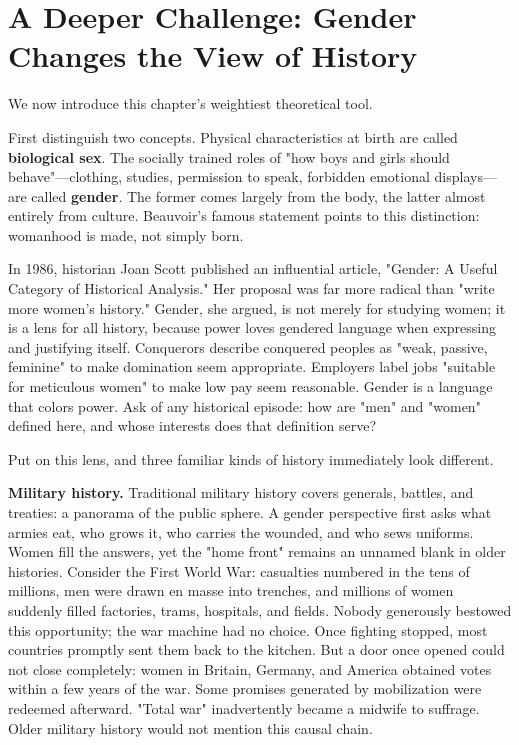\section[Gender Changes the View of History]{A Deeper Challenge: Gender Changes the View of History}
We now introduce this chapter's weightiest theoretical tool.

First distinguish two concepts. Physical characteristics at birth are called \textbf{biological sex}. The socially trained roles of "how boys and girls should behave"---clothing, studies, permission to speak, forbidden emotional displays---are called \textbf{gender}. The former comes largely from the body, the latter almost entirely from culture. Beauvoir's famous statement points to this distinction: womanhood is made, not simply born.

In 1986, historian Joan Scott published an influential article, "Gender: A Useful Category of Historical Analysis." Her proposal was far more radical than "write more women's history." Gender, she argued, is not merely for studying women; it is a lens for all history, because power loves gendered language when expressing and justifying itself. Conquerors describe conquered peoples as "weak, passive, feminine" to make domination seem appropriate. Employers label jobs "suitable for meticulous women" to make low pay seem reasonable. Gender is a language that colors power. Ask of any historical episode: how are "men" and "women" defined here, and whose interests does that definition serve?

Put on this lens, and three familiar kinds of history immediately look different.

\textbf{Military history.} Traditional military history covers generals, battles, and treaties: a panorama of the public sphere. A gender perspective first asks what armies eat, who grows it, who carries the wounded, and who sews uniforms. Women fill the answers, yet the "home front" remains an unnamed blank in older histories. Consider the First World War: casualties numbered in the tens of millions, men were drawn en masse into trenches, and millions of women suddenly filled factories, trams, hospitals, and fields. Nobody generously bestowed this opportunity; the war machine had no choice. Once fighting stopped, most countries promptly sent them back to the kitchen. But a door once opened could not close completely: women in Britain, Germany, and America obtained votes within a few years of the war. Some promises generated by mobilization were redeemed afterward. "Total war" inadvertently became a midwife to suffrage. Older military history would not mention this causal chain.

